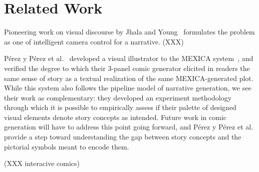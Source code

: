 \section{Related Work}


Pioneering work on visual discourse by
Jhala and Young~\cite{jhala2010cinematic} formulates the problem as one of
intelligent camera control for a narrative.
(XXX)

P\'erez y P\'erez et al.~\cite{perezyperez2012illustrating} developed a 
visual illustrator to the MEXICA system~\cite{perez2001mexica}, and verified
%
the degree to which their 3-panel comic generator 
elicited in readers the same sense of story as a textual realization of 
the same MEXICA-generated plot. 
%
While this system also follows the pipeline model of narrative generation,
we see their work as complementary: they developed an experiment
methodology through which it is possible to empirically assess if their
palette of designed visual elements denote story concepts as intended.
Future work in comic generation will have to address this point going
forward, and P\'erez y P\'erez et al. provide a step toward understanding
the gap between story concepts and the pictorial symbols meant to encode
them. 

(XXX interacive comics)




